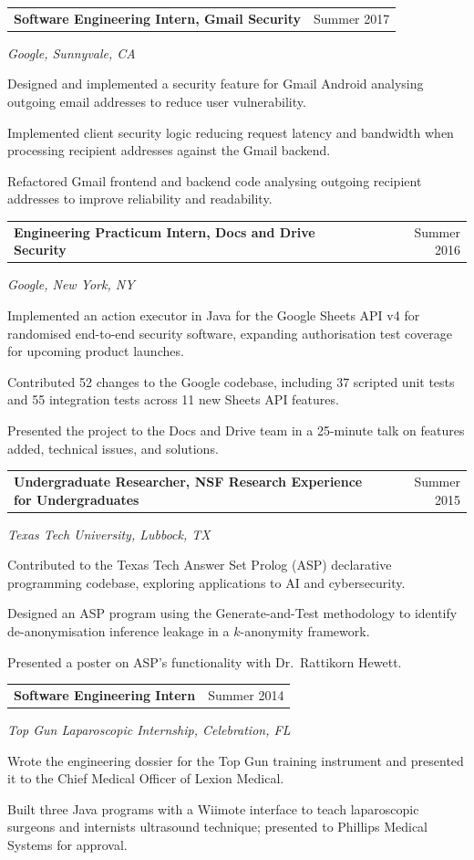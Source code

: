 \documentclass[11pt,letterpaper]{article}
\makeatletter
\newcommand{\entry}[2]{%
  \noindent\begin{tabularx}{\textwidth}{@{}X r@{}}
    #1 & {\small\color{inksoft}#2}
  \end{tabularx}\par
}
\newcommand{\role}[3]{%
  \entry{\textbf{#1}}{#3}%
  {\small\itshape\color{inksoft}#2}\par\vspace{0.15em}
}
\makeatother
\begin{document}
\vspace{0.45em}
\role{Software Engineering Intern, Gmail Security}{Google, Sunnyvale, CA}{Summer 2017}
\begin{bullets}
  \item Designed and implemented a security feature for Gmail Android analysing outgoing email addresses to reduce user vulnerability.
  \item Implemented client security logic reducing request latency and bandwidth when processing recipient addresses against the Gmail backend.
  \item Refactored Gmail frontend and backend code analysing outgoing recipient addresses to improve reliability and readability.
\end{bullets}

\vspace{0.45em}
\role{Engineering Practicum Intern, Docs and Drive Security}{Google, New York, NY}{Summer 2016}
\begin{bullets}
  \item Implemented an action executor in Java for the Google Sheets API v4 for randomised end-to-end security software, expanding authorisation test coverage for upcoming product launches.
  \item Contributed 52 changes to the Google codebase, including 37 scripted unit tests and 55 integration tests across 11 new Sheets API features.
  \item Presented the project to the Docs and Drive team in a 25-minute talk on features added, technical issues, and solutions.
\end{bullets}

\vspace{0.45em}
\role{Undergraduate Researcher, NSF Research Experience for Undergraduates}{Texas Tech University, Lubbock, TX}{Summer 2015}
\begin{bullets}
  \item Contributed to the Texas Tech Answer Set Prolog (ASP) declarative programming codebase, exploring applications to AI and cybersecurity.
  \item Designed an ASP program using the Generate-and-Test methodology to identify de-anonymisation inference leakage in a $k$-anonymity framework.
  \item Presented a poster on ASP's functionality with Dr.~Rattikorn Hewett.
\end{bullets}

\vspace{0.45em}
\role{Software Engineering Intern}{Top Gun Laparoscopic Internship, Celebration, FL}{Summer 2014}
\begin{bullets}
  \item Wrote the engineering dossier for the Top Gun training instrument and presented it to the Chief Medical Officer of Lexion Medical.
  \item Built three Java programs with a Wiimote interface to teach laparoscopic surgeons and internists ultrasound technique; presented to Phillips Medical Systems for approval.
\end{bullets}
\end{document}
